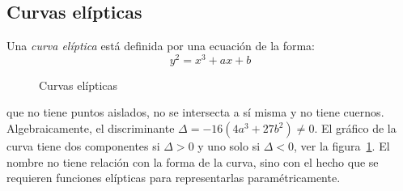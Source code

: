 %

\subsection{Curvas elípticas}
\label{sec:curvas-elipticas}

  Una \emph{curva elíptica}
  está definida por una ecuación de la forma:
  \begin{equation*}
    \label{eq:elliptic-curve}
    y^2
      = x^3 + a x + b
  \end{equation*}
  \begin{figure}
    \centering
    \hspace{1em}%
    \caption{Curvas elípticas}
    \label{fig:curvas-elipticas}
  \end{figure}
  que no tiene puntos aislados,
  no se intersecta a sí misma y no tiene cuernos.
  Algebraicamente,
  el discriminante \(\Delta = - 16 (4 a^3 + 27 b^2) \ne 0\).%
  El gráfico de la curva tiene dos componentes si \(\Delta > 0\)
  y uno solo si \(\Delta < 0\),
  ver la figura~\ref{fig:curvas-elipticas}.
  El nombre no tiene relación con la forma de la curva,
  sino con el hecho que se requieren funciones elípticas
  para representarlas paramétricamente.

